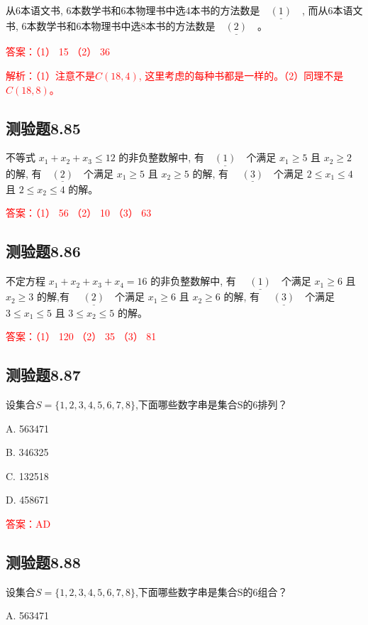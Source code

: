 \documentclass[UTF8, heading=true]{ctexart}
\begin{document}
从6本语文书, 6本数学书和6本物理书中选4本书的方法数是$\underline{\quad(1)\quad}$, 而从6本语文书, 6本数学书和6本物理书中选8本书的方法数是$\underline{\quad(2)\quad}$。

\textcolor{red}{答案：（1） 15 （2） 36}

\textcolor{red}{解析：（1）注意不是$C(18,4)$, 这里考虑的每种书都是一样的。（2）同理不是$C(18,8)$。}


\subsection{测验题8.85}

不等式 $x_1+x_2+x_3 \leq 12$ 的非负整数解中, 有$\underline{\quad(1)\quad}$个满足 $x_1 \geq 5$ 且 $x_2 \geq 2$ 的解, 有$\underline{\quad(2)\quad}$个满足 $x_1 \geq 5$ 且 $x_2 \geq 5$ 的解, 有 $\underline{\quad(3)\quad}$个满足 $2 \leq x_1 \leq 4$ 且 $2 \leq x_2 \leq 4$ 的解。

\textcolor{red}{答案：（1） 56 （2） 10 （3） 63}


\subsection{测验题8.86}

不定方程 $x_1+x_2+x_3+x_4=16$ 的非负整数解中, 有 $\underline{\quad(1)\quad}$个满足 $x_1 \geq 6$ 且 $x_2 \geq 3$ 的解,有
$\underline{\quad(2)\quad}$个满足 $x_1 \geq 6$ 且 $x_2 \geq 6$ 的解, 有 $\underline{\quad(3)\quad}$个满足 $3 \leq x_1 \leq 5$ 且 $3 \leq x_2 \leq 5$ 的解。

\textcolor{red}{答案：（1） 120 （2） 35 （3） 81}

\subsection{测验题8.87}
设集合$S=\{1,2,3,4,5,6,7,8\}$,下面哪些数字串是集合S的6排列？

A. 563471

B. 346325

C. 132518

D. 458671

\textcolor{red}{答案：AD}

\subsection{测验题8.88}

设集合$S=\{1,2,3,4,5,6,7,8\}$,下面哪些数字串是集合S的6组合？

A. 563471
\end{document}
